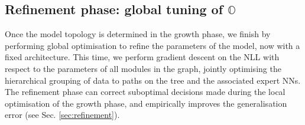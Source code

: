
\subsection{Refinement phase: global tuning of \texorpdfstring{$\mathbb{O}$}{O}}
Once the model topology is determined in the growth phase, we finish by performing global optimisation to refine the parameters of the model, now with a fixed architecture. This time, we perform gradient descent on the NLL with respect to the parameters of all modules in the graph, jointly optimising the hierarchical grouping of data to paths on the tree and the associated expert NNs. The refinement phase can correct suboptimal decisions made during the local optimisation of the growth phase, and empirically improves the generalisation error (see Sec. \ref{sec:refinement}).